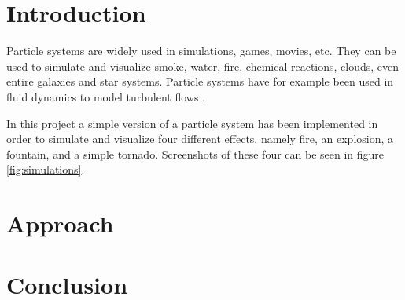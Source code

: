 \section{Introduction}
Particle systems are widely used in simulations, games, movies, etc. They can be used to simulate and visualize smoke, water, fire, chemical reactions, clouds, even entire galaxies and star systems. Particle systems have for example been used in fluid dynamics to model turbulent flows \cite{course_book}.

In this project a simple version of a particle system has been implemented in order to simulate and visualize four different effects, namely fire, an explosion, a fountain, and a simple tornado. Screenshots of these four can be seen in figure \ref{fig:simulations}.

\section{Approach}

\section{Conclusion}
